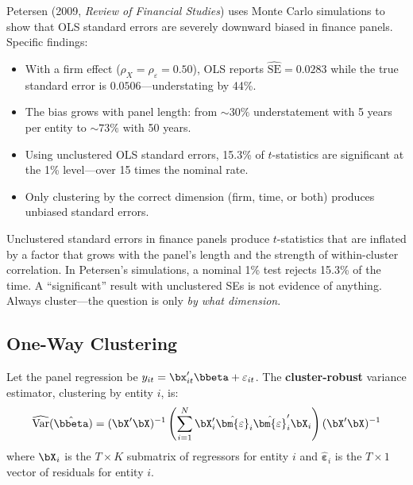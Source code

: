 \begin{keyresult}
Petersen (2009, \textit{Review of Financial Studies}) uses Monte Carlo simulations to show that OLS standard errors are severely downward biased in finance panels.
Specific findings:
\begin{itemize}[leftmargin=*]
  \item With a firm effect ($\rho_X = \rho_\varepsilon = 0.50$), OLS reports $\widehat{\text{SE}} = 0.0283$ while the true standard error is $0.0506$---understating by 44\%.
  \item The bias grows with panel length: from ${\sim}30\%$ understatement with 5 years per entity to ${\sim}73\%$ with 50 years.
  \item Using unclustered OLS standard errors, 15.3\% of $t$-statistics are significant at the 1\% level---over 15 times the nominal rate.
  \item Only clustering by the correct dimension (firm, time, or both) produces unbiased standard errors.
\end{itemize}
\end{keyresult}

\begin{warning}
Unclustered standard errors in finance panels produce $t$-statistics that are inflated by a factor that grows with the panel's length and the strength of within-cluster correlation.
In Petersen's simulations, a nominal 1\% test rejects 15.3\% of the time.
A ``significant'' result with unclustered SEs is not evidence of anything.
Always cluster---the question is only \emph{by what dimension}.
\end{warning}

\subsection{One-Way Clustering}

\begin{definition}
Let the panel regression be $y_{it} = \bx_{it}'\bbeta + \varepsilon_{it}$.
The \textbf{cluster-robust} variance estimator, clustering by entity $i$, is:
\begin{equation}
  \widehat{\operatorname{Var}}(\hat{\bbeta}) = (\bX'\bX)^{-1} \left(\sum_{i=1}^{N} \bX_i' \hat{\bm{\varepsilon}}_i \hat{\bm{\varepsilon}}_i' \bX_i \right) (\bX'\bX)^{-1}
  \label{eq:cluster-var}
\end{equation}
where $\bX_i$ is the $T \times K$ submatrix of regressors for entity $i$ and $\hat{\bm{\varepsilon}}_i$ is the $T \times 1$ vector of residuals for entity $i$.
\end{definition}

